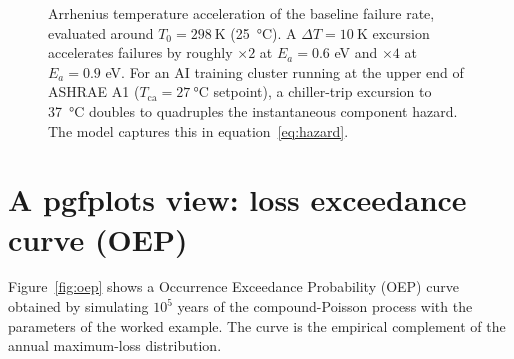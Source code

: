 \documentclass[11pt,a4paper]{article}
\let\origsection\section
\renewcommand{\section}{\clearpage\origsection}
\theoremstyle{ia}
\newcommand{\1}{\mathbf{1}}
\begin{document}
\begin{figure}[ht]
\centering
{}
\caption{Arrhenius temperature acceleration of the baseline failure
rate, evaluated around $T_0=\SI{298}{\kelvin}$ (\SI{25}{\celsius}).
A $\Delta T=\SI{10}{\kelvin}$ excursion accelerates failures by roughly
$\times 2$ at $E_a=0.6$ eV and $\times 4$ at $E_a=0.9$ eV.
For an AI training cluster running at the upper end of ASHRAE A1
($T_{\mathrm{ca}}=\SI{27}{\celsius}$ setpoint), a chiller-trip
excursion to \SI{37}{\celsius} doubles to quadruples the
instantaneous component hazard. The model captures this in
equation~\eqref{eq:hazard}.}
\label{fig:arr}
\end{figure}

\section{A pgfplots view: loss exceedance curve (OEP)}\label{sec:oep}

Figure~\ref{fig:oep} shows a Occurrence Exceedance Probability (OEP)
curve obtained by simulating $10^5$ years of the compound-Poisson
process with the parameters of the worked example. The curve is the
empirical complement of the annual maximum-loss distribution.
\end{document}
